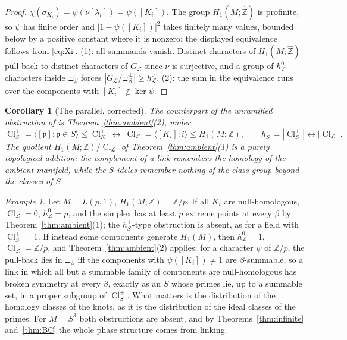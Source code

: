 \documentclass[11pt]{amsart}
\numberwithin{equation}{section}
\newtheorem{corollary}[theorem]{Corollary}
\theoremstyle{definition}
\theoremstyle{remark}
\newtheorem{example}[theorem]{Example}
\newcommand{\Z}{\mathbb{Z}}
\newcommand{\hZ}{\widehat{\Z}}
\newcommand{\cL}{\mathcal{L}}
\newcommand{\pp}{\mathfrak{p}}
\newcommand{\Cl}{\operatorname{Cl}}
\begin{document}
\begin{proof}
$\chi(\sigma_{K_i})=\psi(\nu[\lambda_i])=\psi([K_i])$. The group $H_1(M;\hZ)$ is profinite,
so $\psi$ has finite order and $|1-\psi([K_i])|^2$ takes finitely many values, bounded below
by a positive constant where it is nonzero; the displayed equivalence follows from
\eqref{eq:Xi}. (1): all summands vanish. Distinct characters of
$H_1(M;\hZ)$ pull back to distinct characters of $G_\cL$ since $\nu$ is surjective, and a
group of $h^0_\cL$ characters inside $\Xi_\beta$ forces $|G_\cL/\Xi_\beta^\perp|\ge h^0_\cL$.
(2): the sum in the equivalence runs over the components with $[K_i]\notin\ker\psi$.
\end{proof}

\begin{corollary}[The parallel, corrected]\label{cor:parallel}
The counterpart of the unramified obstruction of \cite[\S4.1]{Main} is
Theorem~\ref{thm:ambient}(2), under
\[
\Cl^+_S=\bigl\langle[\pp]:\pp\in S\bigr\rangle\le\Cl^+_K
\ \longleftrightarrow\
\Cl_\cL=\bigl\langle[K_i]:i\bigr\rangle\le H_1(M;\Z),
\qquad h^+_S=|\Cl^+_S|\leftrightarrow|\Cl_\cL| .
\]
The quotient $H_1(M;\Z)/\Cl_\cL$ of Theorem~\ref{thm:ambient}(1) is a purely topological
addition: the complement of a link remembers the homology of the ambient manifold, while the
$S$-ideles remember nothing of the class group beyond the classes of $S$.
\end{corollary}

\begin{example}\label{ex:lens}
Let $M=L(p,1)$, $H_1(M;\Z)=\Z/p$. If all $K_i$ are null-homologous, $\Cl_\cL=0$, $h^0_\cL=p$,
and the simplex has at least $p$ extreme points at every $\beta$ by
Theorem~\ref{thm:ambient}(1); the $h^+_S$-type obstruction is absent, as for a field with
$\Cl^+_S=1$. If instead some components generate $H_1(M)$, then $h^0_\cL=1$, $\Cl_\cL=\Z/p$,
and Theorem~\ref{thm:ambient}(2) applies: for a character $\psi$ of $\Z/p$, the pull-back
lies in $\Xi_\beta$ iff the components with $\psi([K_i])\ne1$ are $\beta$-summable, so a link
in which all but a summable family of components are null-homologous has broken symmetry at
every $\beta$, exactly as an $S$ whose primes lie, up to a summable set, in a proper subgroup
of $\Cl^+_S$. What matters is the distribution of the homology classes of the knots, as it
is the distribution of the ideal classes of the primes. For $M=S^3$ both obstructions are
absent, and by Theorems~\ref{thm:infinite} and~\ref{thm:BC} the whole phase structure comes
from linking.
\end{example}
\end{document}

